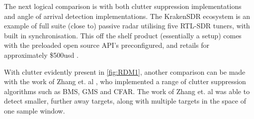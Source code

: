 The next logical comparison is with both clutter suppression implementations and angle of arrival detection implementations. The KrakenSDR ecosystem is an example of full suite (close to) passive radar utilising five RTL-SDR tuners, with built in synchronisation. This off the shelf product (essentially a setup) comes with the preloaded open source API's preconfigured, and retails for approximately \$500usd \cite{KrakenSDR}.
\par With clutter evidently present in \ref{fig:RDM1}, another comparison can be made with the work of Zhang et. al \cite{ZhangClutter}, who implemented a range of clutter suppression algorithms such as BMS, GMS and CFAR. The work of Zhang et. al was able to detect smaller, further away targets, along with multiple targets in the space of one sample window.